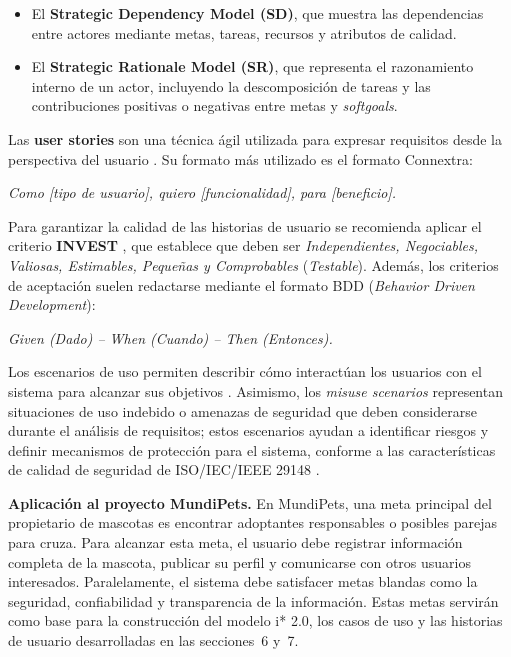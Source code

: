 \documentclass[journal,onecolumn]{IEEEtran}
\begin{document}
\begin{itemize}[leftmargin=*]
  \item El \textbf{Strategic Dependency Model (SD)}, que muestra las
  dependencias entre actores mediante metas, tareas, recursos y atributos de
  calidad.
  \item El \textbf{Strategic Rationale Model (SR)}, que representa el
  razonamiento interno de un actor, incluyendo la descomposición de tareas y
  las contribuciones positivas o negativas entre metas y \textit{softgoals}.
\end{itemize}

Las \textbf{user stories} son una técnica ágil utilizada para expresar
requisitos desde la perspectiva del usuario \cite{cohn2004}. Su formato más
utilizado es el formato Connextra:

\begin{center}
\textit{Como [tipo de usuario], quiero [funcionalidad], para [beneficio].}
\end{center}

Para garantizar la calidad de las historias de usuario se recomienda
aplicar el criterio \textbf{INVEST} \cite{cohn2004}, que establece que deben
ser \textit{Independientes, Negociables, Valiosas, Estimables, Pequeñas y
Comprobables} (\textit{Testable}). Además, los criterios de aceptación
suelen redactarse mediante el formato BDD (\textit{Behavior Driven
Development}):

\begin{center}
\textit{Given (Dado) -- When (Cuando) -- Then (Entonces).}
\end{center}

Los escenarios de uso permiten describir cómo interactúan los usuarios con
el sistema para alcanzar sus objetivos \cite{pohl2025}. Asimismo, los
\textit{misuse scenarios} representan situaciones de uso indebido o
amenazas de seguridad que deben considerarse durante el análisis de
requisitos; estos escenarios ayudan a identificar riesgos y definir
mecanismos de protección para el sistema, conforme a las características
de calidad de seguridad de ISO/IEC/IEEE 29148 \cite{iso29148}.

\textbf{Aplicación al proyecto MundiPets.} En MundiPets, una meta principal
del propietario de mascotas es encontrar adoptantes responsables o posibles
parejas para cruza. Para alcanzar esta meta, el usuario debe registrar
información completa de la mascota, publicar su perfil y comunicarse con
otros usuarios interesados. Paralelamente, el sistema debe satisfacer metas
blandas como la seguridad, confiabilidad y transparencia de la información.
Estas metas servirán como base para la construcción del modelo i* 2.0, los
casos de uso y las historias de usuario desarrolladas en las secciones~6
y~7.
\end{document}
